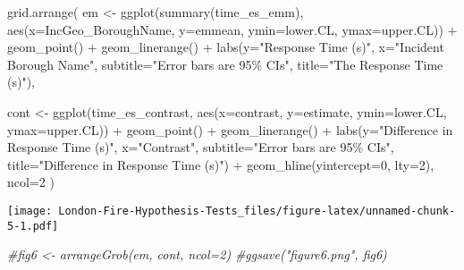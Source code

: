 \documentclass[
]{article}
\newenvironment{Shaded}{\begin{snugshade}}{\end{snugshade}}
\newcommand{\AttributeTok}[1]{\textcolor[rgb]{0.77,0.63,0.00}{#1}}
\newcommand{\CommentTok}[1]{\textcolor[rgb]{0.56,0.35,0.01}{\textit{#1}}}
\newcommand{\DecValTok}[1]{\textcolor[rgb]{0.00,0.00,0.81}{#1}}
\newcommand{\FunctionTok}[1]{\textcolor[rgb]{0.00,0.00,0.00}{#1}}
\newcommand{\NormalTok}[1]{#1}
\newcommand{\OtherTok}[1]{\textcolor[rgb]{0.56,0.35,0.01}{#1}}
\newcommand{\SpecialCharTok}[1]{\textcolor[rgb]{0.00,0.00,0.00}{#1}}
\newcommand{\StringTok}[1]{\textcolor[rgb]{0.31,0.60,0.02}{#1}}
\begin{document}
\begin{Shaded}
\begin{Highlighting}[]
\FunctionTok{grid.arrange}\NormalTok{(}
\NormalTok{    em }\OtherTok{\textless{}{-}} \FunctionTok{ggplot}\NormalTok{(}\FunctionTok{summary}\NormalTok{(time\_es\_emm), }\FunctionTok{aes}\NormalTok{(}\AttributeTok{x=}\NormalTok{IncGeo\_BoroughName, }\AttributeTok{y=}\NormalTok{emmean, }\AttributeTok{ymin=}\NormalTok{lower.CL, }\AttributeTok{ymax=}\NormalTok{upper.CL)) }\SpecialCharTok{+} 
        \FunctionTok{geom\_point}\NormalTok{() }\SpecialCharTok{+} 
        \FunctionTok{geom\_linerange}\NormalTok{() }\SpecialCharTok{+} 
        \FunctionTok{labs}\NormalTok{(}\AttributeTok{y=}\StringTok{"Response Time (s)"}\NormalTok{, }\AttributeTok{x=}\StringTok{"Incident Borough Name"}\NormalTok{, }\AttributeTok{subtitle=}\StringTok{"Error bars are 95\% CIs"}\NormalTok{, }\AttributeTok{title=}\StringTok{"The Response Time (s)"}\NormalTok{), }
    
\NormalTok{    cont }\OtherTok{\textless{}{-}} \FunctionTok{ggplot}\NormalTok{(time\_es\_contrast, }\FunctionTok{aes}\NormalTok{(}\AttributeTok{x=}\NormalTok{contrast, }\AttributeTok{y=}\NormalTok{estimate, }\AttributeTok{ymin=}\NormalTok{lower.CL, }\AttributeTok{ymax=}\NormalTok{upper.CL)) }\SpecialCharTok{+} 
        \FunctionTok{geom\_point}\NormalTok{() }\SpecialCharTok{+} 
        \FunctionTok{geom\_linerange}\NormalTok{() }\SpecialCharTok{+} 
        \FunctionTok{labs}\NormalTok{(}\AttributeTok{y=}\StringTok{"Difference in Response Time (s)"}\NormalTok{, }\AttributeTok{x=}\StringTok{"Contrast"}\NormalTok{, }\AttributeTok{subtitle=}\StringTok{"Error bars are 95\% CIs"}\NormalTok{, }\AttributeTok{title=}\StringTok{"Difference in Response Time (s)"}\NormalTok{) }\SpecialCharTok{+}
        \FunctionTok{geom\_hline}\NormalTok{(}\AttributeTok{yintercept=}\DecValTok{0}\NormalTok{, }\AttributeTok{lty=}\DecValTok{2}\NormalTok{),}
    \AttributeTok{ncol=}\DecValTok{2}
\NormalTok{)}
\end{Highlighting}
\end{Shaded}

\texttt{[image: London-Fire-Hypothesis-Tests\_files/figure-latex/unnamed-chunk-5-1.pdf]}

\begin{Shaded}
\begin{Highlighting}[]
\CommentTok{\#fig6 \textless{}{-} arrangeGrob(em, cont, ncol=2)}
\CommentTok{\#ggsave("figure6.png", fig6)}
\end{Highlighting}
\end{Shaded}
\end{document}
